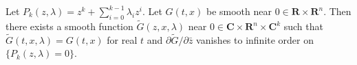 Let $P_k(z, \lambda) = z^k + \sum_{i=0}^{k-1} \lambda_i z^i$. Let $G(t, x)$ be smooth near $0 \in \mathbf{R} \times \mathbf{R}^n$. Then there exists a smooth function $\tilde{G}(z, x, \lambda)$ near $0 \in \mathbf{C} \times \mathbf{R}^n \times \mathbf{C}^k$ such that $\tilde{G}(t, x, \lambda) = G(t, x)$ for real $t$ and $\partial \tilde{G}/\partial \bar{z}$ vanishes to infinite order on $\{P_k(z, \lambda) = 0\}$.
